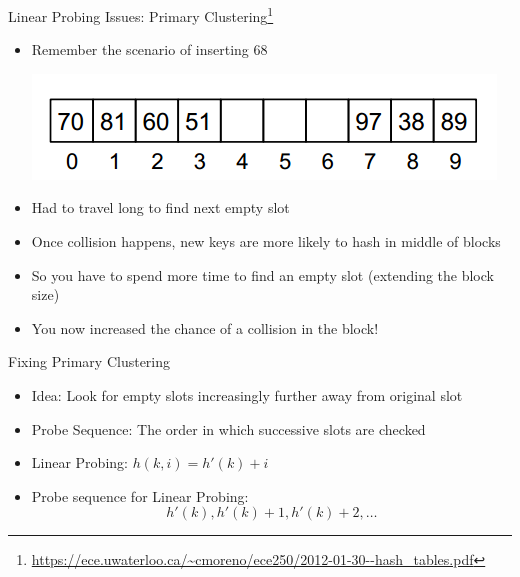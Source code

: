 \documentclass{beamer}
\begin{document}
\begin{frame}{Linear Probing Issues: Primary Clustering\footnote{\url{https://ece.uwaterloo.ca/~cmoreno/ece250/2012-01-30--hash_tables.pdf}}}
    \begin{itemize}
        \item Remember the scenario of inserting $68$
        \begin{center}
            \includegraphics[scale=0.5]{linearProbingClustering.png} 
        \end{center} 
        \item Had to travel long to find next empty slot
        \item Once collision happens, new keys are more likely to hash in middle of blocks 
        \item So you have to spend more time to find an empty slot (extending the block size)
        \item You now increased the chance of a collision in the block!
    \end{itemize}
\end{frame}

\begin{frame}{Fixing Primary Clustering}
    \begin{itemize}
        \item Idea: Look for empty slots increasingly further away from original slot
        \item Probe Sequence: The order in which successive slots are checked
        \item Linear Probing: $h(k,i) = h'(k) + i$
        \item Probe sequence for Linear Probing: $$h'(k), h'(k)+1, h'(k)+2, \ldots$$
    \end{itemize}
\end{frame}
\end{document}
